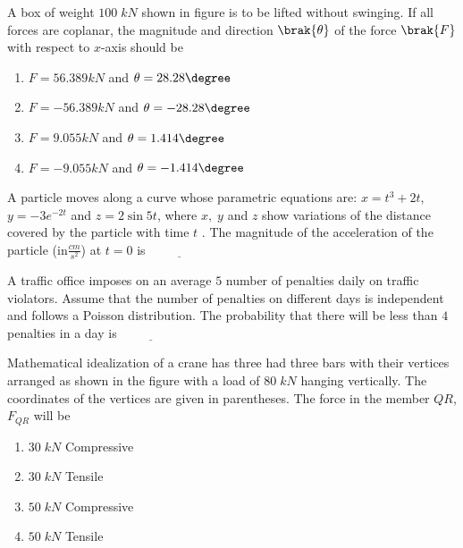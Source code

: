 \iffalse
\chapter{2014}
\section{ce}
\author{AI24BTECH11023 - Tarun Reddy Pakala}
\fi
\item A box of weight $100\;kN$ shown in figure is to be lifted without swinging. If all forces are coplanar, the magnitude and direction $\brak{\theta}$ of the force $\brak{F}$ with respect to $x$-axis should be
	
	\begin{enumerate}
    \item $F=56.389 kN$ and $\theta=28.28\degree$
    \item $F=-56.389 kN$ and $\theta=-28.28\degree$
    \item $F=9.055 kN$ and $\theta=1.414\degree$
    \item $F=-9.055 kN$ and $\theta=-1.414\degree$
\end{enumerate}
\item A particle moves along a curve whose parametric equations are: $x=t^3+2t$, $y=-3e^{-2t}$ and $z=2\sin{5t}$, where $x,\;y$ and $z$ show variations of the distance covered by the particle  with time $t$ . The magnitude of the acceleration of the particle  ({in}\;$\frac{cm}{s^2}$) at $t=0$ is $\underline{\hspace{2cm}}$
\item A traffic office imposes on an average $5$ number of penalties  daily on traffic violators. Assume that the number of penalties on different days is independent and follows a Poisson distribution. The probability that there will be less than $4$ penalties in a day is $\underline{\hspace{2cm}}$
\item Mathematical idealization of a crane has three had three bars with their vertices arranged as shown in the figure with a load of $80\;kN$ hanging vertically. The coordinates of the vertices are given in parentheses. The force in the member $QR$, $F_{QR}$ will be 
	
\begin{enumerate}
    \item $30\;kN$ Compressive
    \item $30\;kN$ Tensile
    \item $50\;kN$ Compressive
    \item $50\;kN$ Tensile
\end{enumerate}
